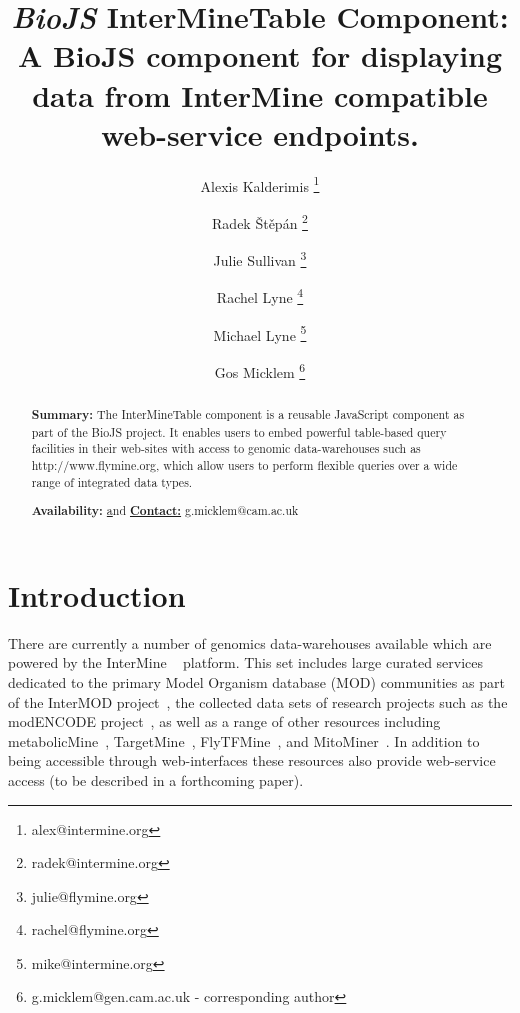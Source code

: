\documentclass[10pt,a4paper,twocolumn]{article}
\begin{document}
\title{\textit{BioJS} InterMineTable Component:
A BioJS component for displaying data from InterMine compatible web-service endpoints.
}

\author[1]{Alexis Kalderimis \thanks{alex@intermine.org}}
\author[1]{Radek Štěpán \thanks{radek@intermine.org}}
\author[1]{Julie Sullivan \thanks{julie@flymine.org}}
\author[1]{Rachel Lyne \thanks{rachel@flymine.org}}
\author[1]{Michael Lyne \thanks{mike@intermine.org}}
\author[1]{Gos Micklem \thanks{g.micklem@gen.cam.ac.uk - corresponding author}}

\maketitle
\thispagestyle{fancy}

\begin{abstract}

\textbf{Summary:}
The InterMineTable component is a reusable JavaScript
component as part of the BioJS project. It enables users to embed
powerful table-based query facilities in their web-sites with
access to genomic data-warehouses such as http://www.flymine.org,
which allow users to perform flexible queries over a wide range
of integrated data types.

\textbf{Availability:}
\href{http://github.com/alexkalderimis/im-tables-biojs} and
\href{http://github.com/biojs/biojs}

\textbf{Contact:} g.micklem@cam.ac.uk

\end{abstract}
\clearpage

\section*{Introduction}

There are currently a number of genomics data-warehouses available which are
powered by the InterMine ~\cite{smith2012} platform. This set includes large
curated services dedicated to the primary Model Organism database (MOD)
communities as part of the InterMOD project~\cite{sullivan2013}, the collected
data sets of research projects such as the modENCODE
project~\cite{contrino2012}, as well as a range of other resources including
metabolicMine~\cite{metabolicmine}, TargetMine~\cite{targetmine},
FlyTFMine~\cite{flytfmine}, and MitoMiner~\cite{mitominer}.  In addition to
being accessible through web-interfaces these resources also provide web-service
access (to be described in a forthcoming paper).
\end{document}
